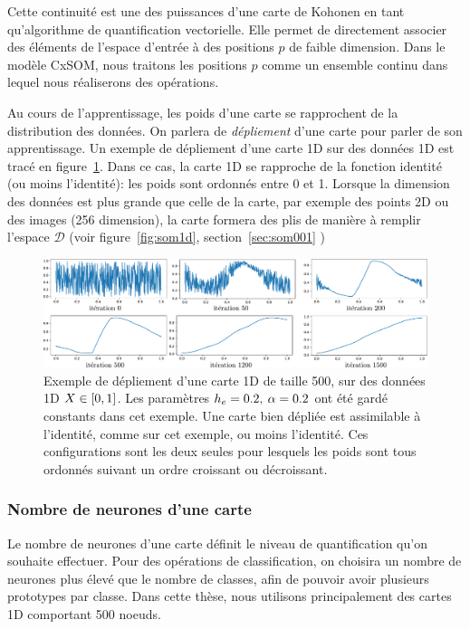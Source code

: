 Cette continuité est une des puissances d'une carte de Kohonen en tant qu'algorithme de quantification vectorielle. Elle permet de directement associer des éléments de l'espace d'entrée à des positions $p$ de faible dimension. Dans le modèle CxSOM, nous traitons les positions $p$ comme un ensemble continu dans lequel nous réaliserons des opérations. 


Au cours de l'apprentissage, les poids d'une carte se rapprochent de la distribution des données. On parlera de \emph{dépliement} d'une carte pour parler de son apprentissage. Un exemple de dépliement d'une carte 1D sur des données 1D est tracé en figure~\ref{fig:depliement}.
Dans ce cas, la carte 1D se rapproche de la fonction identité (ou moins l'identité): les poids sont ordonnés entre 0 et 1.
Lorsque la dimension des données est plus grande que celle de la carte, par exemple des points 2D ou des images (256 dimension), la carte formera des plis de manière à remplir l'espace $\mathcal{D}$ (voir figure~\ref{fig:som1d}, section~\ref{sec:som001} ) 

\begin{figure}
\centering
\includegraphics[width=\textwidth]{depliement_1D.pdf}
\caption{Exemple de dépliement d'une carte 1D de taille 500, sur des données 1D $X \in [0,1]$. Les paramètres $h_{e} = 0.2, \: \alpha = 0.2$ ont été gardé constants dans cet exemple. Une carte bien dépliée est assimilable à l'identité, comme sur cet exemple, ou moins l'identité. Ces configurations sont les deux seules pour lesquels les poids sont tous ordonnés suivant un ordre croissant ou décroissant.}
\label{fig:depliement}
\end{figure}


\subsubsection{Nombre de neurones d'une carte}
Le nombre de neurones d'une carte définit le niveau de quantification qu'on souhaite effectuer. Pour des opérations de classification, on choisira un nombre de neurones plus élevé que le nombre de classes, afin de pouvoir avoir plusieurs prototypes par classe.
Dans cette thèse, nous utilisons principalement des cartes 1D comportant 500 noeuds.


